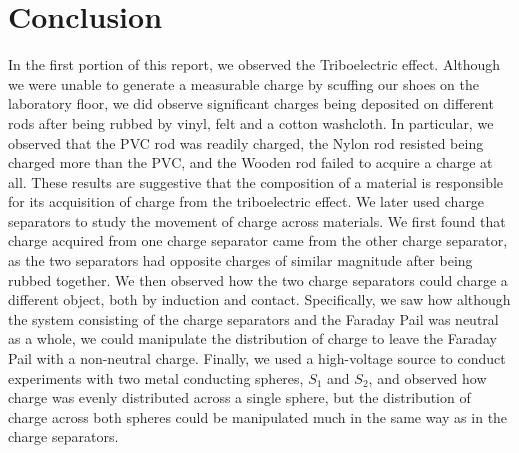 \documentclass[12pt]{amsart}
\begin{document}
\section{Conclusion}
\indent In the first portion of this report, we observed the Triboelectric effect. Although we were unable to generate a measurable charge by scuffing our shoes on the laboratory floor, we did observe significant charges being deposited on different rods after being rubbed by vinyl, felt and a cotton washcloth. In particular, we observed that the PVC rod was readily charged, the Nylon rod resisted being charged more than the PVC, and the Wooden rod failed to acquire a charge at all. These results are suggestive that the composition of a material is responsible for its acquisition of charge from the triboelectric effect. We later used charge separators to study the movement of charge across materials. We first found that charge acquired from one charge separator came from the other charge separator, as the two separators had opposite charges of similar magnitude after being rubbed together. We then observed how the two charge separators could charge a different object, both by induction and contact. Specifically, we saw how although the system consisting of the charge separators and the Faraday Pail was neutral as a whole, we could manipulate the distribution of charge to leave the Faraday Pail with a non-neutral charge. Finally, we used a high-voltage source to conduct experiments with two metal conducting spheres, $S_1$ and $S_2$, and observed how charge was evenly distributed across a single sphere, but the distribution of charge across both spheres could be manipulated much in the same way as in the charge separators.
\newpage

\printbibliography

	
\end{document}
